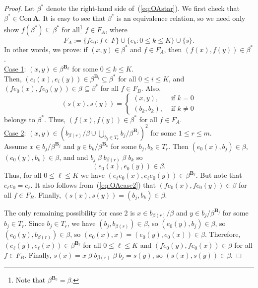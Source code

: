 \documentclass[cm,dissertation,actual,final]{uhthesis}
\theoremstyle{plain}
\theoremstyle{definition}
\theoremstyle{remark}
\numberwithin{theorem}{section}
\numberwithin{claim}{chapter}
\numberwithin{equation}{section}
\numberwithin{conjecture}{chapter}
\newcommand{\<}{\ensuremath{\langle}}
\renewcommand{\>}{\ensuremath{\rangle}}
\renewcommand{\leq}{\ensuremath{\leqslant}}
\newcommand{\Con}{\ensuremath{\mathrm{Con\,}}}
\newcommand{\0}{\ensuremath{\mathbf{0}}}
\newcommand{\1}{\ensuremath{\mathbf{1}}}
\newcommand{\2}{\ensuremath{\mathbf{2}}}
\newcommand{\3}{\ensuremath{\mathbf{3}}}
\newcommand{\4}{\ensuremath{\mathbf{4}}}
\newcommand{\5}{\ensuremath{\mathbf{5}}}
\newcommand{\bA}{\ensuremath{\mathbf{A}}}
\newcommand{\bB}{\ensuremath{\mathbf{B}}}
\begin{document}
\begin{proof} 
  Let $\beta^*$ denote the right-hand side of~(\ref{eq:OAstar}).  
  We first check that $\beta^*\in \Con\bA$. 
  It is easy to see that $\beta^*$ is an equivalence relation, so we need only
  show $f(\beta^*) \subseteq \beta^*$ for all\footnote{Note that $\beta^{\bB_0} = \beta$.} 
  $f\in F_A$, where 
  \[
  F_A := \{f e_0 : f\in F\} \cup \{e_k : 0\leq k \leq K\} \cup \{s\}.
  \] 
  In other words, we prove: if 
  $(x,y)\in \beta^*$ and $f\in F_A$, then $(f(x), f(y))\in \beta^*$.\\[6pt]
  \underline{Case 1}:  $(x,y)\in \beta^{\bB_k}$ for some $0\leq k\leq K$. \\[4pt] Then,
  $(e_i(x),e_i(y))\in \beta^{\bB_i} \subseteq \beta^*$ for all $0\leq i\leq K$,
  and $(f e_0(x),f e_0(y))\in \beta \subseteq \beta^*$ for all $f \in F_B$. Also,
  \[
  (s(x),s(y))= 
  \begin{cases}
    (x,y), & \text{ if $k=0$}\\
    (b_k,b_k), & \text{ if $k\neq 0$}
  \end{cases} %
  \]
  belongs to $\beta^*$.  Thus, $(f(x), f(y))\in \beta^*$ for all $f\in F_A$.\\[6pt]
  \underline{Case 2}: 
  $(x,y) \in \left(b_{\beta(r)}/\beta \cup \bigcup_{b_j\in T_r}
  b_j/\beta^{\bB_j}\right)^2$ for some $1\leq r\leq m$.\\[4pt]
  Assume $x\in b_j/\beta^{\bB_j}$ and $y\in b_k/\beta^{\bB_k}$ for some $b_j, b_k
  \in T_r$.  Then $(e_0(x), b_j) \in \beta$, 
  $(e_0(y), b_k) \in \beta$, and and $b_j\;\beta\; b_{\beta(r)}\; \beta\; b_k$ so 
  \begin{equation}
    \label{eq:OAcase2}
    (e_0(x), e_0(y)) \in \beta.
  \end{equation}
  Thus, for all $0\leq \ell \leq K$ we have 
  $(e_\ell e_0(x), e_\ell e_0(y)) \in \beta^{\bB_\ell}$.  But note that $e_\ell
  e_0 = e_\ell$.  It also follows from~(\ref{eq:OAcase2}) that $(f e_0(x), f
  e_0(y))\in \beta$ for all $f\in F_B$.  Finally, 
  $(s(x),s(y))=(b_j, b_k) \in \beta$.

  The only remaining possibility for case 2 is $x\in b_{\beta(r)}/\beta$ and $y\in
  b_j/\beta^{\bB_j}$ for some $b_j\in T_r$.  Since $b_j\in T_r$, we have
  $(b_j,b_{\beta(r)})\in \beta$, so 
  $(e_0(y), b_j) \in \beta$, so 
  $(e_0(y), b_{\beta(r)}) \in \beta$, so 
  $(e_0(x), x) = (e_0(y), e_0(x)) \in \beta$.
  Therefore, $(e_\ell(y), e_\ell(x)) \in \beta^{\bB_\ell}$ for all $0\leq \ell \leq K$ and 
  $(f e_0(y), f e_0(x)) \in \beta$ for all $f\in F_B$. Finally, $s(x) = x \;\beta\;
  b_{\beta(r)}\; \beta \;b_j = s(y)$, so $(s(x),s(y)) \in \beta$.


\end{proof}
\end{document}
